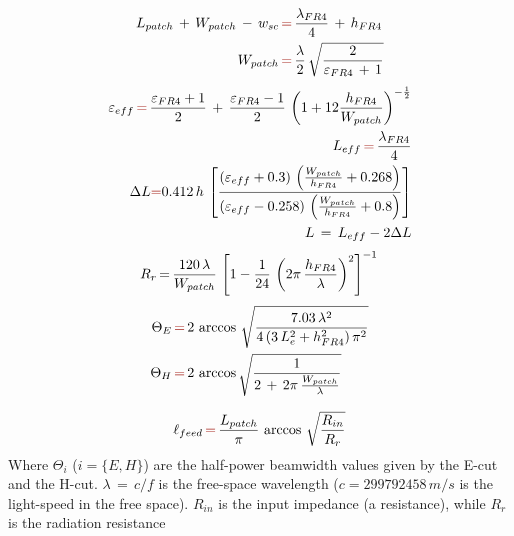 \documentclass[12pt,a4paper]{article}
\begin{document}
{\begin{equation}
	\begin{aligned}L_{patch}\,+\,W_{patch}\,-\,w_{sc}\,&{\color{Mahogany}=}\,\frac{\lambda_{FR4}}{4}\,+\,h_{FR4}\\
		W_{patch}\,&{\color{Mahogany}=}\,\frac{\lambda}{2}\,\sqrt{\frac{2}{\varepsilon_{FR4}\,+\,1}}\\
	\end{aligned}
\end{equation}
\begin{equation}
	\begin{aligned}
		\varepsilon_{eff}\,{\color{Mahogany}=}\,\frac{\varepsilon_{FR4}+1}{2}\,+\,\frac{\varepsilon_{FR4}-1}{2}\,\left(1+12\frac{h_{FR4}}{W_{patch}}\right)^{-\frac{1}{2}}\\
		L_{eff}\,{\color{Mahogany}=}\,\frac{\lambda_{FR4}}{4}\\
		\Delta L{\color{Mahogany}=}0.412\,h\,\left[\frac{(\varepsilon_{eff}+0.3)\,\left(\frac{W_{patch}}{h_{FR4}}+0.268\right)}{(\varepsilon_{eff}-0.258)\,\left(\frac{W_{patch}}{h_{FR4}}+0.8\right)}\right]\\
		L\,=\,L_{eff}-2\Delta L
	\end{aligned}
\end{equation}
\begin{equation}
R_r\,{=}\,\frac{120\,\lambda}{W_{patch}}\,\left[1-\frac{1}{24}\,\left(2\pi\,\frac{h_{FR4}}{\lambda}\right)^{2}\right]^{-1}\\
\end{equation}
\begin{equation}
	\begin{aligned}
		\Theta_E\,&{\color{Mahogany}=}\,2\,\arccos\,\sqrt{\frac{7.03\,\lambda^2}{4\,(3\,L_e^2+h_{FR4}^2)\,\pi^2}}\\
		\Theta_H\,&{\color{Mahogany}=}\,2\,\arccos\sqrt{\frac{1}{2\,+\,2\pi\,\frac{W_{patch}}{\lambda}}}\\
	\end{aligned}
\end{equation}

\begin{equation}
	\ell_{feed}\,{\color{Mahogany}=}\,\frac{L_{patch}}{\pi}\,\arccos\,\sqrt{\frac{R_{in}}{R_r}}
\end{equation}
Where $\Theta_i$ ($i=\{E,H\}$) are the half-power beamwidth values given by the E-cut and the H-cut. $\lambda\,=\,c/f$ is the free-space wavelength ($c=299 792 458\,m/s$ is the light-speed in the free space). $R_{in}$ is the input impedance (a resistance), while $R_r$ is the radiation resistance
}
\end{document}
